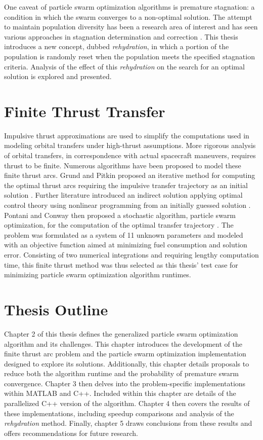 \noindent One caveat of particle swarm optimization algorithms is premature stagnation: a condition in which the swarm converges to a non-optimal solution. The attempt to maintain population 
diversity has been a research area of interest and has seen various approaches in stagnation determination and correction \citep{PSOstag1, PSOstag2}. This thesis introduces a new concept,
dubbed \textit{rehydration}, in which a portion of the population is randomly reset when the population meets the specified stagnation criteria. Analysis of the effect of this
\textit{rehydration} on the search for an optimal solution is explored and presented.

\section{Finite Thrust Transfer}

\noindent Impulsive thrust approximations are used to simplify the computations used in modeling orbital transfers under high-thrust assumptions.
More rigorous analysis of orbital transfers, in correspondence with actual spacecraft maneuvers, requires thrust to be finite. Numerous algorithms have been
proposed to model these finite thrust arcs. Grund and Pitkin proposed an iterative method for computing the optimal thrust arcs requiring the impulsive transfer trajectory as
an initial solution \citep{Fthrust1}. Further literature introduced an indirect solution applying optimal control theory using nonlinear programming from an initially guessed
solution \citep{Fthrust2}. Pontani and Conway then proposed a stochastic algorithm, particle swarm optimization, for the computation of the optimal transfer trajectory \citep{Pontani_Conway}. The problem was formulated as 
a system of 11 unknown parameters and modeled with an objective function aimed at minimizing fuel consumption
and solution error. Consisting of two numerical integrations and requiring lengthy computation time, this finite thrust 
method was thus selected as this thesis' test case for minimizing particle swarm optimization algorithm runtimes.


\section{Thesis Outline}

\noindent Chapter 2 of this thesis defines the generalized particle swarm optimization algorithm and its challenges. This chapter introduces the development of the finite thrust arc problem
and the particle swarm optimization implementation designed to explore its solutions. Additionally, this chapter 
details proposals to reduce both the algorithm runtime and the probability of premature swarm convergence.
Chapter 3 then delves into the problem-specific implementations within MATLAB and C++. Included within
this chapter are details of the parallelized C++ version of the algorithm. 
Chapter 4 then covers the results of these implementations, including speedup comparisons and analysis of the \textit{rehydration} method.
Finally, chapter 5 draws conclusions from these results and offers recommendations for future research. 